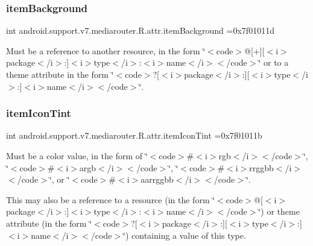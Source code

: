 \subsubsection{\texorpdfstring{item\+Background}{itemBackground}}
{\footnotesize\ttfamily int android.\+support.\+v7.\+mediarouter.\+R.\+attr.\+item\+Background =0x7f01011d\hspace{0.3cm}{\ttfamily [static]}}

Must be a reference to another resource, in the form \char`\"{}$<$code$>$@\mbox{[}+\mbox{]}\mbox{[}$<$i$>$package$<$/i$>$\+:\mbox{]}$<$i$>$type$<$/i$>$\+:$<$i$>$name$<$/i$>$$<$/code$>$\char`\"{} or to a theme attribute in the form \char`\"{}$<$code$>$?\mbox{[}$<$i$>$package$<$/i$>$\+:\mbox{]}\mbox{[}$<$i$>$type$<$/i$>$\+:\mbox{]}$<$i$>$name$<$/i$>$$<$/code$>$\char`\"{}. \mbox{\label{classandroid_1_1support_1_1v7_1_1mediarouter_1_1R_1_1attr_a78d0574accf4f52f2f8f0b04c9934fad}} 
\subsubsection{\texorpdfstring{item\+Icon\+Tint}{itemIconTint}}
{\footnotesize\ttfamily int android.\+support.\+v7.\+mediarouter.\+R.\+attr.\+item\+Icon\+Tint =0x7f01011b\hspace{0.3cm}{\ttfamily [static]}}

Must be a color value, in the form of \char`\"{}$<$code$>$\#$<$i$>$rgb$<$/i$>$$<$/code$>$\char`\"{}, \char`\"{}$<$code$>$\#$<$i$>$argb$<$/i$>$$<$/code$>$\char`\"{}, \char`\"{}$<$code$>$\#$<$i$>$rrggbb$<$/i$>$$<$/code$>$\char`\"{}, or \char`\"{}$<$code$>$\#$<$i$>$aarrggbb$<$/i$>$$<$/code$>$\char`\"{}. 

This may also be a reference to a resource (in the form \char`\"{}$<$code$>$@\mbox{[}$<$i$>$package$<$/i$>$\+:\mbox{]}$<$i$>$type$<$/i$>$\+:$<$i$>$name$<$/i$>$$<$/code$>$\char`\"{}) or theme attribute (in the form \char`\"{}$<$code$>$?\mbox{[}$<$i$>$package$<$/i$>$\+:\mbox{]}\mbox{[}$<$i$>$type$<$/i$>$\+:\mbox{]}$<$i$>$name$<$/i$>$$<$/code$>$\char`\"{}) containing a value of this type. \mbox{\label{classandroid_1_1support_1_1v7_1_1mediarouter_1_1R_1_1attr_a7fc8391afad02325065f1f8739e50024}} 
